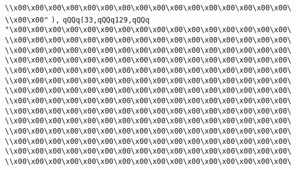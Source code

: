 \verb|\\x00\x00\x00\x00\x00\x00\x00\x00\x00\x00\x00\x00\x00\x00\x00\x00\|\newline
\verb|\\x00\x00"|\newline
\verb|),|\newline
\verb|qQQq(33,qQQq129,qQQq|\newline
\verb|"\x00\x00\x00\x00\x00\x00\x00\x00\x00\x00\x00\x00\x00\x00\x00\x00\|\newline
\verb|\\x00\x00\x00\x00\x00\x00\x00\x00\x00\x00\x00\x00\x00\x00\x00\x00\|\newline
\verb|\\x00\x00\x00\x00\x00\x00\x00\x00\x00\x00\x00\x00\x00\x00\x00\x00\|\newline
\verb|\\x00\x00\x00\x00\x00\x00\x00\x00\x00\x00\x00\x00\x00\x00\x00\x00\|\newline
\verb|\\x00\x00\x00\x00\x00\x00\x00\x00\x00\x00\x00\x00\x00\x00\x00\x00\|\newline
\verb|\\x00\x00\x00\x00\x00\x00\x00\x00\x00\x00\x00\x00\x00\x00\x00\x00\|\newline
\verb|\\x00\x00\x00\x00\x00\x00\x00\x00\x00\x00\x00\x00\x00\x00\x00\x00\|\newline
\verb|\\x00\x00\x00\x00\x00\x00\x00\x00\x00\x00\x00\x00\x00\x00\x00\x00\|\newline
\verb|\\x00\x00\x00\x00\x00\x00\x00\x00\x00\x00\x00\x00\x00\x00\x00\x00\|\newline
\verb|\\x00\x00\x00\x00\x00\x00\x00\x00\x00\x00\x00\x00\x00\x00\x00\x00\|\newline
\verb|\\x00\x00\x00\x00\x00\x00\x00\x00\x00\x00\x00\x00\x00\x00\x00\x00\|\newline
\verb|\\x00\x00\x00\x00\x00\x00\x00\x00\x00\x00\x00\x00\x00\x00\x00\x00\|\newline
\verb|\\x00\x00\x00\x00\x00\x00\x00\x00\x00\x00\x00\x00\x00\x00\x00\x00\|\newline
\verb|\\x00\x00\x00\x00\x00\x00\x00\x00\x00\x00\x00\x00\x00\x00\x00\x00\|\newline
